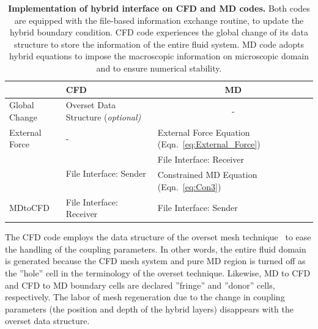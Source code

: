 \documentclass[preprint,12pt]{elsarticle}
\begin{document}
\begin{table}
  \caption{\small
{\bf Implementation of hybrid interface on CFD and MD codes.} Both codes are equipped with the file-based information exchange routine, to update the hybrid boundary condition. CFD code experiences the global change of its data structure to store the information of the entire fluid system. MD code adopts 
hybrid equations to impose the macroscopic information on microscopic domain and to ensure numerical stability. 
}
  \label{table:interface_implementation}
  \centering
\footnotesize
 \begin{tabular}{>{\centering}p{} || p{} | p{} }
\hline
  & \centering CFD & \multicolumn{1}{c}{MD} \\
\hline
 Global Change & Overset Data Structure (\it{optional}) & \multicolumn{1}{c}{-} \\
\hline
 \centering External Force & \centering - & External Force Equation (Eqn.~\ref{eq:External_Force}) \\
\hline
 \multirow{2}{*}{CFDtoMD} &  \multirow{2}{*}{File Interface: Sender} & {File Interface: Receiver} \\
 & & Constrained MD Equation (Eqn.~\ref{eq:Con3}) \\
\hline
 MDtoCFD & File Interface: Receiver & File Interface: Sender \\
\hline
\end{tabular}
\vspace{-1em}
\end{table}


The CFD code employs the data structure of the overset mesh technique~\cite{Chimera}  to ease the handling of the coupling parameters. In other words, the entire fluid domain is generated because the CFD mesh system and pure MD region is turned off as the ''hole'' cell in the terminology of the overset technique. Likewise, MD to CFD and CFD to MD boundary cells are declared ''fringe'' and ''donor'' cells, respectively. The labor of mesh regeneration due to the change in coupling parameters (the position and depth of the hybrid layers) disappears with the overset data structure.
\end{document}
